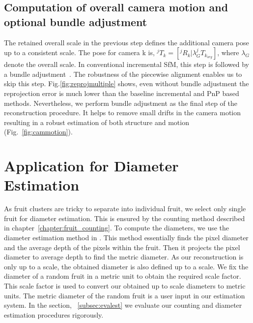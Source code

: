 \subsection{Computation of  overall camera motion and optional bundle adjustment}
\label{subsec:camera motion}
The retained overall scale in the previous step defines the additional camera pose up to a consistent scale. The pose for camera k is,  $^jT_k = \left[^jR_k|\lambda_G ^j T_{k_{org}}\right]$, where $\lambda_G$ denote the overall scale. In conventional incremental SfM, this step is followed by a bundle adjustment~\cite{bunad}. The robustness of the piecewise alignment enables us to skip this step. Fig.\ref{fig:reprojmultiple} shows, even without bundle adjustment the reprojection error is much lower than the baseline incremental and PnP based methods. Nevertheless, we perform bundle adjustment as the final step of the reconstruction procedure. It helps to remove small drifts in the camera motion resulting in a robust estimation of both structure and motion (Fig.~\ref{fig:cammotion}).


\section{Application for Diameter Estimation}\label{sec:estimation}
As fruit clusters are tricky to separate into individual fruit, we select only single fruit for diameter estimation. This is ensured by the counting method described in chapter~\ref{chapter:fruit_counting}. To compute the diameters, we use the diameter estimation method in \cite{techreport }. This method essentially finds the pixel diameter and the average depth of the pixels within the fruit. Then it projects the pixel diameter to average depth to find the metric diameter. As our reconstruction is only up to a scale, the obtained diameter is also defined up to a scale. We fix the diameter of a random fruit in a metric unit to obtain the required scale factor. This scale factor is used to convert our obtained up to scale diameters to metric units. The metric diameter of the random fruit is a user input in our estimation system. In the section, ~\ref{subsec:evalest} we evaluate our counting and diameter estimation procedures rigorously.


